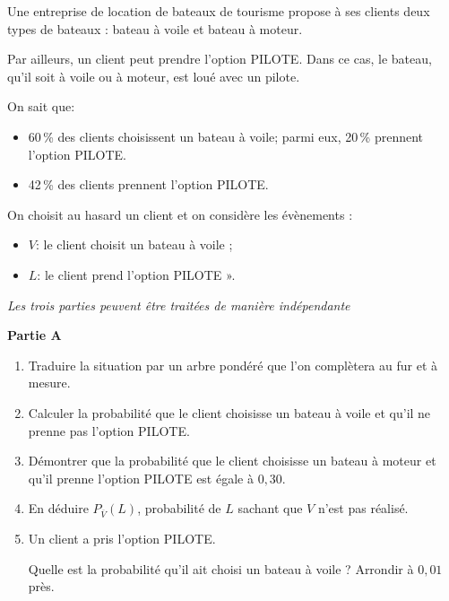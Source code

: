 \medskip

Une entreprise de location de bateaux de tourisme propose à ses clients deux types de bateaux : bateau à voile et bateau à moteur.

Par ailleurs, un client peut prendre l'option PILOTE. Dans ce cas, le bateau, qu'il soit à voile ou à moteur, est loué avec un pilote.

On sait que:
\begin{itemize}
\item[$\bullet~$] 60\,\% des clients choisissent un bateau à voile;
parmi eux, 20\,\% prennent l'option PILOTE.
\item[$\bullet~$] 42\,\% des clients prennent l'option PILOTE.
\end{itemize}

On choisit au hasard un client et on considère les évènements :

\begin{itemize}
\item[$\bullet~$]$V$: \og le client choisit un bateau à voile\fg{} ;
\item[$\bullet~$]$L$: \og le client prend l'option PILOTE ».
\end{itemize}

\begin{center}\emph{Les trois parties peuvent être traitées de manière indépendante}\end{center}

\medskip

\textbf{Partie A}

\medskip

\medskip

\begin{enumerate}
\item Traduire la situation par un arbre pondéré que l'on complètera au fur et à mesure.
\item Calculer la probabilité que le client choisisse un bateau à voile et qu'il ne prenne pas l'option PILOTE.
\item Démontrer que la probabilité que le client choisisse un bateau à moteur et qu'il prenne l'option PILOTE est égale à $0,30$.
\item En déduire $P_{\overline{V}}(L)$, probabilité de $L$ sachant que $V$ n'est pas réalisé.
\item Un client a pris l'option PILOTE.

Quelle est la probabilité qu'il ait choisi un bateau à voile ? Arrondir à $0,01$ près.
\end{enumerate}


